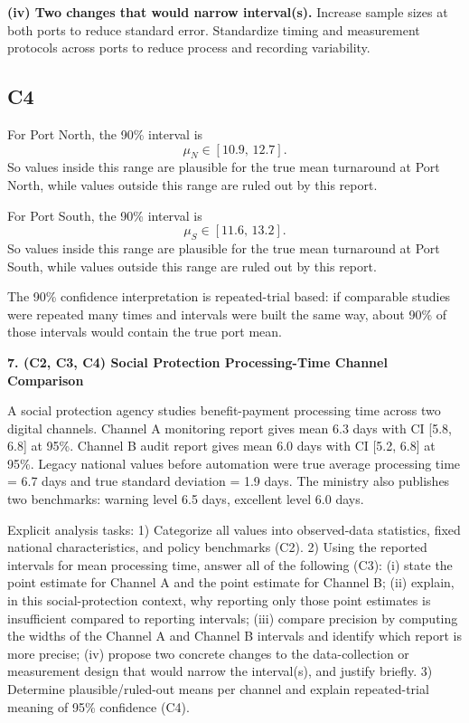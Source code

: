 \begin{ExamProblems}
		\textbf{(iv) Two changes that would narrow interval(s).}
		Increase sample sizes at both ports to reduce standard error.
		Standardize timing and measurement protocols across ports to reduce process and recording variability.
		
		\subsection*{C4}
		For Port North, the 90\% interval is
		\[
		\mu_N\in[10.9,\,12.7].
		\]
		So values inside this range are plausible for the true mean turnaround at Port North, while values outside this range are ruled out by this report.
		
		For Port South, the 90\% interval is
		\[
		\mu_S\in[11.6,\,13.2].
		\]
		So values inside this range are plausible for the true mean turnaround at Port South, while values outside this range are ruled out by this report.
		
		The 90\% confidence interpretation is repeated-trial based: if comparable studies were repeated many times and intervals were built the same way, about 90\% of those intervals would contain the true port mean.
		
		\newpage
		\item
		\textbf{7. (C2, C3, C4) Social Protection Processing-Time Channel Comparison}
		
		A social protection agency studies benefit-payment processing time across two digital channels.
		Channel A monitoring report gives mean 6.3 days with CI [5.8, 6.8] at 95\%.
		Channel B audit report gives mean 6.0 days with CI [5.2, 6.8] at 95\%.
		Legacy national values before automation were true average processing time = 6.7 days and true standard deviation = 1.9 days.
		The ministry also publishes two benchmarks: warning level 6.5 days, excellent level 6.0 days.
		
		Explicit analysis tasks:
		1) Categorize all values into observed-data statistics, fixed national characteristics, and policy benchmarks (C2).
		2) Using the reported intervals for mean processing time, answer all of the following (C3): (i) state the point estimate for Channel A and the point estimate for Channel B; (ii) explain, in this social-protection context, why reporting only those point estimates is insufficient compared to reporting intervals; (iii) compare precision by computing the widths of the Channel A and Channel B intervals and identify which report is more precise; (iv) propose two concrete changes to the data-collection or measurement design that would narrow the interval(s), and justify briefly.
		3) Determine plausible/ruled-out means per channel and explain repeated-trial meaning of 95\% confidence (C4).
		

\end{ExamProblems}
